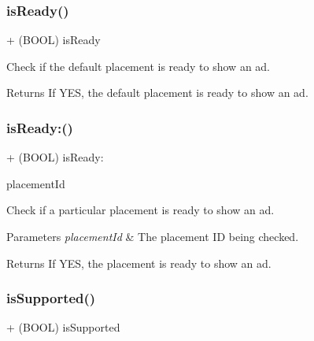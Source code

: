 \subsubsection{\texorpdfstring{isReady()}{isReady()}}
{\footnotesize\ttfamily + (B\+O\+OL) is\+Ready \begin{DoxyParamCaption}{ }\end{DoxyParamCaption}}

Check if the default placement is ready to show an ad.

\begin{DoxyReturn}{Returns}
If {\ttfamily Y\+ES}, the default placement is ready to show an ad. 
\end{DoxyReturn}
\mbox{\label{interface_unity_ads_ab599b1f26750aa88f4e0c7be90203276}} 
\subsubsection{\texorpdfstring{isReady:()}{isReady:()}}
{\footnotesize\ttfamily + (B\+O\+OL) is\+Ready\+: \begin{DoxyParamCaption}\item[{(N\+S\+String $\ast$)}]{placement\+Id }\end{DoxyParamCaption}}

Check if a particular placement is ready to show an ad.


\begin{DoxyParams}{Parameters}
{\em placement\+Id} & The placement ID being checked.\\
\hline
\end{DoxyParams}
\begin{DoxyReturn}{Returns}
If {\ttfamily Y\+ES}, the placement is ready to show an ad. 
\end{DoxyReturn}
\mbox{\label{interface_unity_ads_a88647c57b1d0a967ac74d9f847982561}} 
\subsubsection{\texorpdfstring{isSupported()}{isSupported()}}
{\footnotesize\ttfamily + (B\+O\+OL) is\+Supported \begin{DoxyParamCaption}{ }\end{DoxyParamCaption}}

